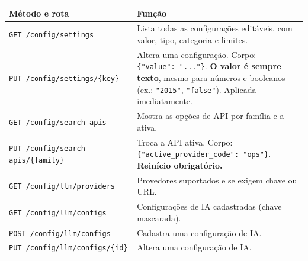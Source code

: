 \documentclass[
  brazilian,
  a4paper,12pt,oneside]{report}
\newcounter{none} %
\begin{document}
{\def\LTcaptype{none} %
\begin{longtable}[]{@{}
  >{\raggedright\arraybackslash}p{}
  >{\raggedright\arraybackslash}p{}@{}}
\toprule\noalign{}
\begin{minipage}[b]{\linewidth}\raggedright
Método e rota
\end{minipage} & \begin{minipage}[b]{\linewidth}\raggedright
Função
\end{minipage} \\
\midrule\noalign{}
\endhead
\bottomrule\noalign{}
\endlastfoot
\texttt{GET\ /}\allowbreak{}\texttt{config/}\allowbreak{}\texttt{settings}
& Lista todas as configurações editáveis, com valor, tipo, categoria e
limites. \\
\texttt{PUT\ /}\allowbreak{}\texttt{config/}\allowbreak{}\texttt{settings/}\allowbreak{}\texttt{\{key\}}
& Altera uma configuração. Corpo:
\texttt{\{"value":}\allowbreak{}\texttt{\ ".}\allowbreak{}\texttt{.}\allowbreak{}\texttt{.}\allowbreak{}\texttt{"\}}.
\textbf{O valor é sempre texto}, mesmo para números e booleanos (ex.:
\texttt{"2015"}, \texttt{"false"}). Aplicada imediatamente. \\
\texttt{GET\ /}\allowbreak{}\texttt{config/}\allowbreak{}\texttt{search-}\allowbreak{}\texttt{apis}
& Mostra as opções de API por família e a ativa. \\
\texttt{PUT\ /}\allowbreak{}\texttt{config/}\allowbreak{}\texttt{search-}\allowbreak{}\texttt{apis/}\allowbreak{}\texttt{\{family\}}
& Troca a API ativa. Corpo:
\texttt{\{"active\_}\allowbreak{}\texttt{provider\_}\allowbreak{}\texttt{code":}\allowbreak{}\texttt{\ "ops"\}}.
\textbf{Reinício obrigatório.} \\
\texttt{GET\ /}\allowbreak{}\texttt{config/}\allowbreak{}\texttt{llm/}\allowbreak{}\texttt{providers}
& Provedores suportados e se exigem chave ou URL. \\
\texttt{GET\ /}\allowbreak{}\texttt{config/}\allowbreak{}\texttt{llm/}\allowbreak{}\texttt{configs}
& Configurações de IA cadastradas (chave mascarada). \\
\texttt{POST\ /}\allowbreak{}\texttt{config/}\allowbreak{}\texttt{llm/}\allowbreak{}\texttt{configs}
& Cadastra uma configuração de IA. \\
\texttt{PUT\ /}\allowbreak{}\texttt{config/}\allowbreak{}\texttt{llm/}\allowbreak{}\texttt{configs/}\allowbreak{}\texttt{\{id\}}
& Altera uma configuração de IA. \\

\end{longtable}}
\end{document}
